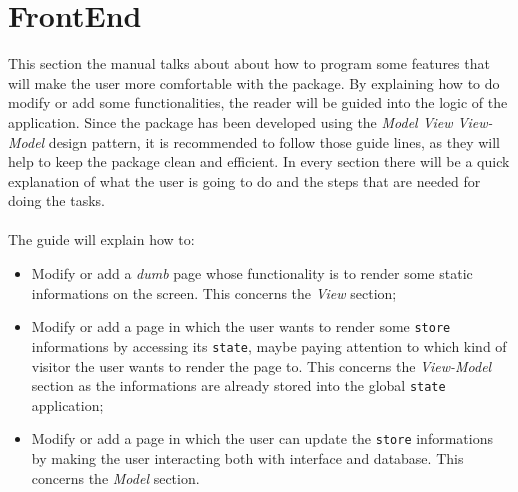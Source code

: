 \section{FrontEnd}
This section the manual talks about about how to program some features that will make the user more comfortable with the package. By explaining how to do modify or add some functionalities, the reader will be guided into the logic of the application.
Since the package has been developed using the \emph{Model View View-Model} design pattern, it is recommended to follow those guide lines, as they will help to keep the package clean and efficient. In every section there will be a quick explanation of what the user is going to do and the steps that are needed for doing the tasks.
~\\~\\The guide will explain how to:
\begin{itemize}
	\item Modify or add a \textit{dumb} page whose functionality is to render some static informations on the screen. This concerns the \emph{View} section;
	\item Modify or add a page in which the user wants to render some \verb|store| informations by accessing its \verb|state|, maybe paying attention to which kind of visitor the user wants to render the page to. This concerns the \emph{View-Model} section as the informations are already stored into the global \verb|state| application;
	\item Modify or add a page in which the user can update the \verb|store| informations by making the user interacting both with interface and database. This concerns the \emph{Model} section.
\end{itemize}

